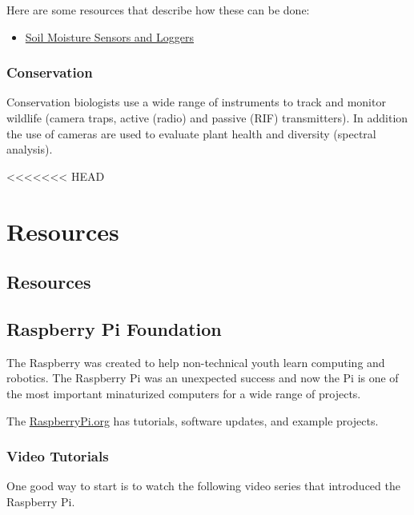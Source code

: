 \documentclass{article}\usepackage[]{graphicx}\usepackage[]{color}
\begin{document}
Here are some resources that describe how these can be done:

\begin{itemize}
\item \href{https://fyi.extension.wisc.edu/cropirrigation/files/2015/03/Methods.to_.Monitor.Soil_.Moisture.pdf}{Soil Moisture Sensors and Loggers}
\end{itemize}

\subsubsection{Conservation} 

Conservation biologists use a wide range of instruments to track and monitor wildlife (camera traps, active (radio) and passive (RIF) transmitters). In addition the use of cameras are used to evaluate plant health and diversity (spectral analysis). 

<<<<<<< HEAD


\section{Resources}

\subsection{Resources}

\subsection{Raspberry Pi Foundation}

The Raspberry was created to help non-technical youth learn computing and robotics. The Raspberry Pi was an unexpected success and now the Pi is one of the most important minaturized computers for a wide range of projects.  

The \href{https://www.raspberrypi.org/}{RaspberryPi.org} has tutorials, software updates, and example projects.

\subsubsection{Video Tutorials}

One good way to start is to watch the following video series that introduced the Raspberry Pi. 

\end{document}
